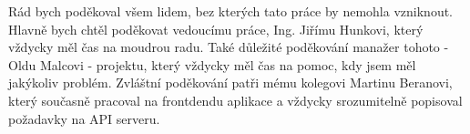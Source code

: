 Rád bych poděkoval všem lidem, bez kterých tato práce by nemohla vzniknout. Hlavně bych chtěl poděkovat vedoucímu práce, Ing. Jiřímu Hunkovi, který vždycky měl čas na moudrou radu. Také důležité poděkování manažer tohoto - Oldu Malcovi - projektu, který vždycky měl čas na pomoc, kdy jsem měl jakýkoliv problém. Zvláštní poděkování patři mému kolegovi Martinu Beranovi, který současně pracoval na frontdendu aplikace a vždycky srozumitelně popisoval požadavky na API serveru.